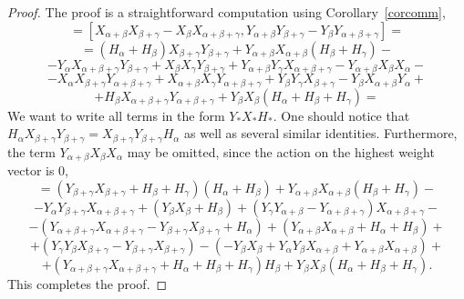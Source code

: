 \documentclass[twoside,a4paper,12pt]{article}
\theoremstyle{definition}
\begin{document}
\begin{proof}
	The proof is a straightforward computation using Corollary~\ref{corcomm},
	\begin{equation*}
		[Q,R]=[X_{\alpha+\beta}X_{\beta+\gamma}-X_\beta X_{\alpha+\beta+\gamma},
			Y_{\alpha+\beta}Y_{\beta+\gamma}-Y_\beta Y_{\alpha+\beta+\gamma}]=
	\end{equation*}
	\begin{equation*}
		=(H_\alpha+H_\beta)X_{\beta+\gamma}Y_{\beta+\gamma}
		+Y_{\alpha+\beta}X_{\alpha+\beta}(H_\beta+H_\gamma)-
	\end{equation*}
	\begin{equation*}
		-Y_\alpha X_{\alpha+\beta+\gamma}Y_{\beta+\gamma}
		+X_\beta X_\gamma Y_{\beta+\gamma}
		+Y_{\alpha+\beta}Y_\gamma X_{\alpha+\beta+\gamma}
		-Y_{\alpha+\beta}X_\beta X_\alpha-
	\end{equation*}
	\begin{equation*}
		-X_\alpha X_{\beta+\gamma}Y_{\alpha+\beta+\gamma}
		+X_{\alpha+\beta}X_\gamma Y_{\alpha+\beta+\gamma}
		+Y_\beta Y_\gamma X_{\beta+\gamma}
		-Y_\beta X_{\alpha+\beta}Y_\alpha+
	\end{equation*}
	\begin{equation*}
		+H_\beta X_{\alpha+\beta+\gamma}Y_{\alpha+\beta+\gamma}
		+Y_\beta X_\beta(H_\alpha+H_\beta+H_\gamma)=
	\end{equation*}
	We want to write all terms in the form $Y_*X_*H_*$.
	One should notice that $H_\alpha X_{\beta+\gamma}Y_{\beta+\gamma}=
	X_{\beta+\gamma}Y_{\beta+\gamma}H_\alpha$ as well as several similar
	identities.
	Furthermore, the term $Y_{\alpha+\beta}X_\beta X_\alpha$ may be omitted,
	since the action on the highest weight vector is 0,
	\begin{equation*}
		=(Y_{\beta+\gamma}X_{\beta+\gamma}+H_\beta+H_\gamma)(H_\alpha+H_\beta)
		+Y_{\alpha+\beta}X_{\alpha+\beta}(H_\beta+H_\gamma)-
	\end{equation*}
	\begin{equation*}
		-Y_\alpha Y_{\beta+\gamma}X_{\alpha+\beta+\gamma}
		+(Y_\beta X_\beta+H_\beta)
		+(Y_\gamma Y_{\alpha+\beta}-Y_{\alpha+\beta+\gamma})
			X_{\alpha+\beta+\gamma}-
	\end{equation*}
	\begin{equation*}
		-(Y_{\alpha+\beta+\gamma}X_{\alpha+\beta+\gamma}
			-Y_{\beta+\gamma}X_{\beta+\gamma}+H_\alpha)
		+(Y_{\alpha+\beta}X_{\alpha+\beta}+H_\alpha+H_\beta)+
	\end{equation*}
	\begin{equation*}
		+(Y_\gamma Y_\beta X_{\beta+\gamma}-Y_{\beta+\gamma}X_{\beta+\gamma})
		-(-Y_\beta X_\beta+Y_\alpha Y_\beta X_{\alpha+\beta}
			+Y_{\alpha+\beta}X_{\alpha+\beta})+
	\end{equation*}
	\begin{equation*}
		+(Y_{\alpha+\beta+\gamma}X_{\alpha+\beta+\gamma}
			+H_\alpha+H_\beta+H_\gamma)H_\beta
		+Y_\beta X_\beta(H_\alpha+H_\beta+H_\gamma).
	\end{equation*}
	This completes the proof.
\end{proof}
\end{document}
